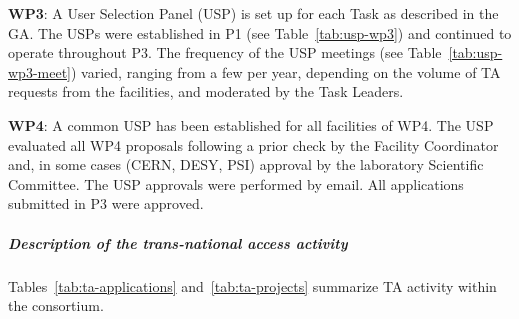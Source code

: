 \textbf{WP3}: A User Selection Panel (USP) is set up for each Task as described in the GA. The USPs were established in P1 (see Table~\ref{tab:usp-wp3}) and continued to operate throughout P3. The frequency of the USP meetings (see Table~\ref{tab:usp-wp3-meet}) varied, ranging from a few per year, depending on the volume of TA requests from the facilities, and moderated by the Task Leaders.


\textbf{WP4}: \mbox{}
A common USP has been established for all facilities of WP4. The USP evaluated all WP4 proposals following a prior check by the Facility Coordinator and, in some cases (CERN, DESY, PSI) approval by the laboratory Scientific Committee. The USP approvals were performed by email. All applications submitted in P3 were approved.



\subparagraph{Description of the trans-national access activity}\mbox{}

Tables~\ref{tab:ta-applications} and~\ref{tab:ta-projects} summarize TA activity within the consortium.



